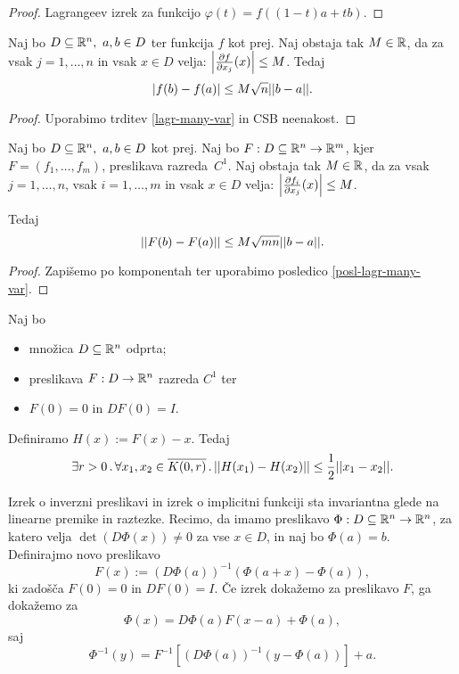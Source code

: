 \begin{proof}
    Lagrangeev izrek za funkcijo $\varphi(t) = f((1-t)a + tb)$.
\end{proof}

\begin{posledica}
    \label{posl-lagr-many-var}
    Naj bo $D \subseteq \mathbb{R}^n, \ a,b \in D$ ter funkcija \(f\) kot prej. Naj obstaja tak $M \in \mathbb{R}$, da za vsak $j = 1, \ldots, n$ in vsak $x \in D$ velja: $\left|\frac{\partial f}{\partial x_j}(x)\right| \leq M$. Tedaj $$|f(b)-f(a)| \leq M \sqrt{n}||b-a||.$$
\end{posledica}

\begin{proof}
    Uporabimo trditev \ref{lagr-many-var} in CSB neenakost.
\end{proof}

\begin{posledica}
    Naj bo $D \subseteq \mathbb{R}^n, \ a,b \in D$ kot prej. Naj bo $F: D \subseteq \mathbb{R}^n \to \mathbb{R}^m$, kjer $F = (f_1, \ldots, f_m)$, preslikava razreda~$C^1$. Naj obstaja tak $M \in \mathbb{R}$, da za vsak $j = 1, \ldots, n$, vsak $i = 1, \ldots, m$ in vsak $x \in D$ velja: $\left|\frac{\partial f_i}{\partial x_j}(x)\right| \leq M$. 
    
    Tedaj $$||F(b) - F(a)|| \leq M \sqrt{mn} ||b - a||.$$
\end{posledica}

\begin{proof}
    Zapišemo po komponentah ter uporabimo posledico \ref{posl-lagr-many-var}.
\end{proof}

\begin{lema}
    \label{pomozna-trditev}
    Naj bo 
    \begin{itemize}
        \item množica $D \subseteq \mathbb{R}^n$ odprta;
        \item preslikava $F: D \to \mathbb{R}^n$ razreda $C^1$ ter
        \item \(F(0) = 0\) in \(DF(0) = I\).
    \end{itemize}
    Definiramo \(H(x) := F(x) - x\). Tedaj 
    \[\exists r > 0 \,.\, \forall x_1, x_2 \in \overline{K(0, r)} \,.\, ||H(x_1) - H(x_2)|| \leq \frac{1}{2} ||x_1 - x_2||.\]
\end{lema}

\begin{opomba}
    \label{poenastovitev}
    Izrek o inverzni preslikavi in izrek o implicitni funkciji sta invariantna glede na linearne premike in raztezke. Recimo, da imamo preslikavo \(\Phi: D \subseteq \mathbb{R}^n \to \mathbb{R}^n\), za katero velja \(\det(D\Phi(x)) \neq 0\) za vse \(x \in D\), in naj bo \(\Phi(a) = b\). Definirajmo novo preslikavo
    \[
        F(x) := (D\Phi(a))^{-1}(\Phi(a + x) - \Phi(a)),
    \]
    ki zadošča \(F(0) = 0\) in \(DF(0) = I\). Če izrek dokažemo za preslikavo \(F\), ga dokažemo za
    \[
        \Phi(x) = D\Phi(a) F(x - a) + \Phi(a),
    \]
    saj
    \[
        \Phi^{-1}(y) = F^{-1}[(D\Phi(a))^{-1}(y - \Phi(a))] + a.
    \]
\end{opomba}

